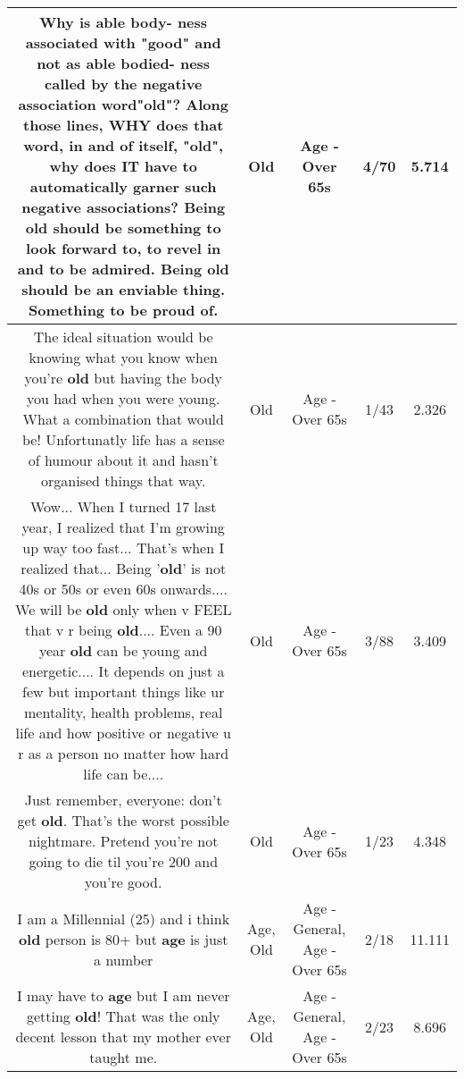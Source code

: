 \documentclass[11pt]{article}
\newlength\mylength
\begin{document}
\begin{center}
\begin{longtable}{|C{.65\mylength}|C{.30\mylength}|C{.12\mylength}|C{.12\mylength}|C{.12\mylength}|}
  \small Why is able body- ness associated with "good" and not as able bodied- ness called by the negative association word"\textbf{old}"? Along those lines, WHY does that word, in and of itself, "\textbf{old}", why does IT have to automatically garner such negative associations? Being \textbf{old} should be something to look forward to, to revel in and to be admired. Being \textbf{old} should be an enviable thing. Something to be proud of.\normalsize   & Old & Age - Over 65s & 4/70 & 5.714 \\  \hline
  \small The ideal situation would be knowing what you know when you're \textbf{old} but having the body you had when you were young. What a combination that would be! Unfortunatly life has a sense of humour about it and hasn't organised things that way.\normalsize   & Old & Age - Over 65s & 1/43 & 2.326 \\  \hline
  \small Wow... When I turned 17 last year, I realized that I'm growing up way too fast... That's when I realized that... Being '\textbf{old}' is not 40s or 50s or even 60s onwards.... We will be \textbf{old} only when v FEEL that v r being \textbf{old}.... Even a 90 year \textbf{old} can be young and energetic.... It depends on just a few but important things like ur mentality, health problems, real life and how positive or negative u r as a person no matter how hard life can be....\normalsize   & Old & Age - Over 65s & 3/88 & 3.409 \\  \hline
  \small Just remember, everyone: don't get \textbf{old}. That's the worst possible nightmare. Pretend you're not going to die til you're 200 and you're good.\normalsize   & Old & Age - Over 65s & 1/23 & 4.348 \\  \hline
  \small I am a Millennial  (25) and i think \textbf{old} person is 80+ but \textbf{age} is just a number\normalsize   & Age, Old & Age - General, Age - Over 65s & 2/18 & 11.111 \\  \hline
  \small I may have to \textbf{age} but I am never getting \textbf{old}! That was the only decent lesson that my mother ever taught me.\normalsize   & Age, Old & Age - General, Age - Over 65s & 2/23 & 8.696 \\  \hline

\end{longtable}
\end{center}
\end{document}
